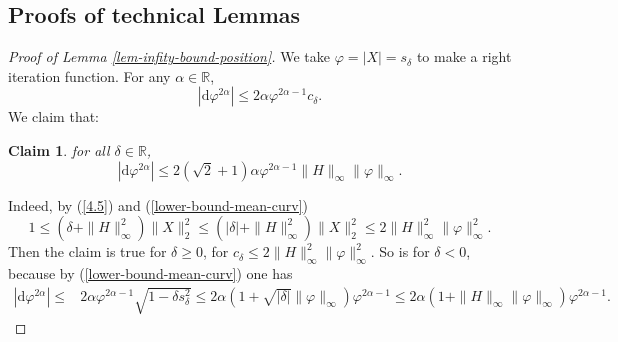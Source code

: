 \documentclass{amsart}
\numberwithin{equation}{section}
\newtheorem{claim}[theo]{Claim}
\theoremstyle{remark}
\renewcommand{\(}{\left(}
\renewcommand{\)}{\right)}
\renewcommand{\~}{\tilde}
\renewcommand{\-}{\overline}
\newcommand{\R}{\mathbb{R}}
\renewcommand{\a}{\alpha}
\renewcommand{\d}{\delta}
\newcommand{\mrm}{\mathrm}
\begin{document}
\subsection{Proofs of technical Lemmas}

\begin{proof}[Proof of Lemma \ref{lem-infity-bound-position}]
	We take $\varphi=|X|=s_\d$ to make a right iteration function.
	For any $\alpha\in \mathbb R$,  $$|\mrm{d}\varphi^{2\a}|\leq 2\a\varphi^{2\a-1} c_\d.$$
	We claim that:
	\begin{claim}
		for all $\d\in\R$,
		$$
		|\mrm{d}\varphi^{2\a}|\leq 2(\sqrt{2}+1)\a \varphi^{2\a-1}\|H\|_\infty\|\varphi\|_\infty.
		$$
	\end{claim}
	Indeed, by (\ref{4.5}) and (\ref{lower-bound-mean-curv})
	$$
	1\leq (\d+\|H\|_\infty^2)\|X\|_2^2\leq (|\d|+\|H\|_\infty^2)\|X\|_2^2 \leq 2\|H\|_\infty^2 \|\varphi\|_\infty^2.
	$$
	Then the claim is true for $\d \ge 0$, for $c_\d\le 2\|H\|_\infty^2 \|\varphi\|_\infty^2$.
	So is for $\d<0$, because by (\ref{lower-bound-mean-curv}) one has
	\begin{align*}
	|\mrm{d}\varphi^{2\a}|\leq &2\a\varphi^{2\a-1}\sqrt{1-\d  s_\d^2}
	\leq 2\a(1+\sqrt{|\d|}\|\varphi\|_\infty)\varphi^{2\a-1}
	\leq 2\a(1+\|H\|_\infty\|\varphi\|_\infty)\varphi^{2\a-1}.
	\end{align*}
	

\end{proof}
\end{document}
